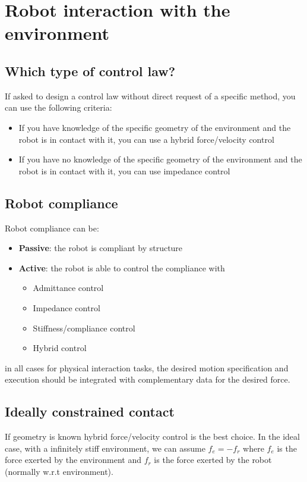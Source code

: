 \documentclass[a4paper,12pt]{article}
\begin{document}
\section{Robot interaction with the environment}
\subsection{Which type of control law?}
If asked to design a control law without direct request of a
 specific method, you can use the following criteria:
\begin{itemize}
    \item If you have knowledge of the specific geometry of the
    environment and the robot is in contact with it, you can use
    a hybrid force/velocity control
    \item If you have no knowledge of the specific geometry of the
    environment and the robot is in contact with it, you can use
    impedance control
\end{itemize}
\subsection{Robot compliance}
Robot compliance can be:
\begin{itemize}
    \item \textbf{Passive}: the robot is compliant by structure
    \item \textbf{Active}: the robot is able to control the compliance
    with \begin{itemize}
    \item Admittance control
    \item Impedance control
    \item Stiffness/compliance control
    \item Hybrid control
    \end{itemize}
\end{itemize}
in all cases for physical interaction tasks, the desired motion
specification and execution should be integrated with
complementary data for the desired force.
\subsection{Ideally constrained contact}
If geometry is known hybrid force/velocity control is the best choice.
In the ideal case, with a infinitely stiff environment,
we can assume $f_e = - f_r$ where $f_e$ is the force exerted by the
environment and $f_r$ is the force exerted by the robot (normally w.r.t environment).\\
\end{document}
